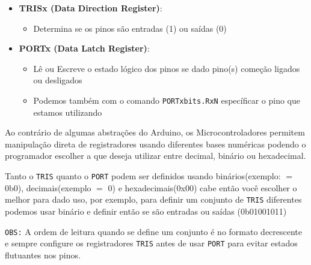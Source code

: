 \documentclass[12pt,a4paper]{book}
\begin{document}
\begin{itemize}
    \item \textbf{TRISx (Data Direction Register)}:
    \begin{itemize}
        \item Determina se os pinos são entradas (1) ou saídas (0)
    \end{itemize}
    \item \textbf{PORTx (Data Latch Register)}:
    \begin{itemize}
        \item Lê ou Escreve o estado lógico dos pinos se dado pino(s) começão ligados ou desligados
        \item Podemos também com o comando \texttt{PORTxbits.RxN} específicar o pino que estamos utilizando
    \end{itemize}
\end{itemize}
\begin{tcolorbox}[
    enhanced,
    title={\textbf{\textcolor{white}{Boas Práticas}}},
    colback=gray!5!white,
    colframe=gray!75!black,
    fonttitle=\bfseries\large,
    colbacktitle=gray!85!black,
    coltitle=white,
    arc=4pt,
    boxrule=2pt,
    top=8pt,
    bottom=8pt,
    left=8pt,
    right=8pt,
]
Ao contrário de algumas abstrações do Arduino, os Microcontroladores permitem manipulação direta de registradores usando diferentes bases numéricas podendo o programador escolher a que deseja utilizar entre decimal, binário ou hexadecimal.

Tanto o \texttt{TRIS} quanto o \texttt{PORT} podem ser definidos usando binários(exemplo: $=$ 0b0), decimais(exemplo $=$ 0) e hexadecimais(0x00) cabe então você escolher o melhor para dado uso, por exemplo, para definir um conjunto de \texttt{TRIS} diferentes podemos usar binário e definir então se são entradas ou saídas (0b01001011)

\texttt{OBS:} A ordem de leitura quando se define um conjunto é no formato decrescente e sempre configure os registradores \texttt{TRIS} antes de usar \texttt{PORT} para evitar estados flutuantes nos pinos.
\end{tcolorbox}
\end{document}

